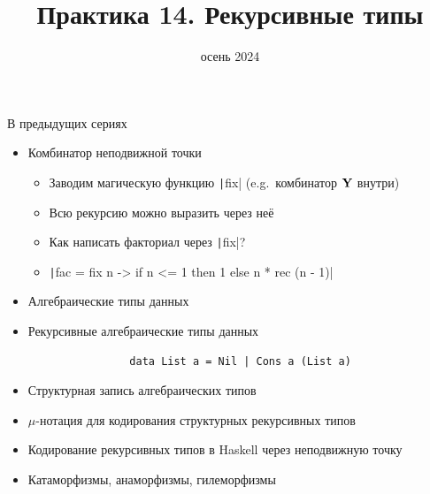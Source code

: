 
\newif\ifhandout




\title[14. Рекурсивные типы]{Практика 14. Рекурсивные типы}
\date{осень 2024}



    \setcounter{framenumber}{-1}
    \mymaketitle

    \begin{frame}[fragile]{В предыдущих сериях}
        \vspace{-0.5em}
        \begin{itemize}
            \item \pause Комбинатор неподвижной точки
            \begin{itemize}
                \item Заводим магическую функцию \texttt|fix| (e.g.\ комбинатор $\mathbf{Y}$ внутри)
                \item Всю рекурсию можно выразить через неё
                \item[\todo] Как написать факториал через \texttt|fix|?
                \item[\answer] \pause \texttt|fac = fix \rec n -> if n <= 1 then 1 else n * rec (n - 1)|
            \end{itemize}
            \item \pause Алгебраические типы данных
            \item Рекурсивные алгебраические типы данных
            \begin{verbatim}
                data List a = Nil | Cons a (List a)
            \end{verbatim}
            \item[\newtopic] \pause Структурная запись алгебраических типов
            \item[\newtopic] $\mu$-нотация для кодирования структурных рекурсивных типов
            \item[\newtopic] Кодирование рекурсивных типов в Haskell через неподвижную точку
            \item[\newtopic] Катаморфизмы, анаморфизмы, гилеморфизмы
        \end{itemize}
    \end{frame}

